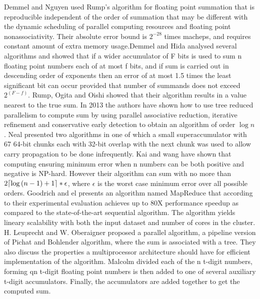 \documentclass[11pt]{article}       %
\DeclarePairedDelimiter{\ceil}{\lceil}{\rceil}
\begin{document}
Demmel and Nguyen \cite{PRS} used Rump’s algorithm for floating point summation that is reproducible independent of the order of summation that may be different with the dynamic scheduling of parallel computing resources and floating point nonassociativity. Their absolute error bound is $2^{-28}$ times macheps, and requires constant amount of extra memory usage.Demmel and Hida \cite{AEFPS} analysed several algorithms and showed that if a wider accumulator of F bits is used to sum n floating point numbers each of at most f bits, and if sum is carried out in descending order of exponents then an error of at most 1.5 times the least significant bit can occur provided that number of summands does not exceed $2^{(F-f)}$.
Rump, Ogita and Oishi \cite{AFPSPFR} showed that their algorithm results in a value nearest to the true sum. 
In 2013 the authors \cite{APFPA} have shown how to use tree reduced parallelism to compute sum by using parallel associative reduction, iterative refinement and conservative early detection to obtain an algorithm of order $\log {n}$. 
Neal \cite{FESUSLS} presented two algorithms in one of which a small superaccumulator with 67 64-bit chunks each with 32-bit overlap with the next chunk was used to allow carry propagation to be done infrequently. Kai and wang \cite{LTALCNS} have shown that computing ensuring minimum error when n numbers can be both positive and negative is NP-hard. However their algorithm can sum with no more than $2\ceil*{\log {(n-1)}+1}*\epsilon$, where $\epsilon$ is the worst case minimum error over all possible orders.
Goodrich and el \cite{PASFPN} presents an algorithm named MapReduce that according to their experimental evaluation achieves up to 80X performance speedup as compared to the state-of-the-art sequential algorithm. The algorithm yields lineary scalability with both the input dataset and number of cores in the cluster.
H. Leuprecht and W. Oberaigner \cite{PARESFP} proposed a parallel algorithm, a pipeline version of Pichat and Bohlender algorithm, where the sum is associated with a tree. They also discuss the properties a multiprocessor architecture should have for efficient implementation of the algorithm.
Malcolm \cite{OAFPS} divided each of the n t-digit numbers, forming qn t-digit floating point numbers is then added to one of several  auxiliary t-digit accumulators. Finally, the accumulators are added together to get the computed sum.





\end{document}
